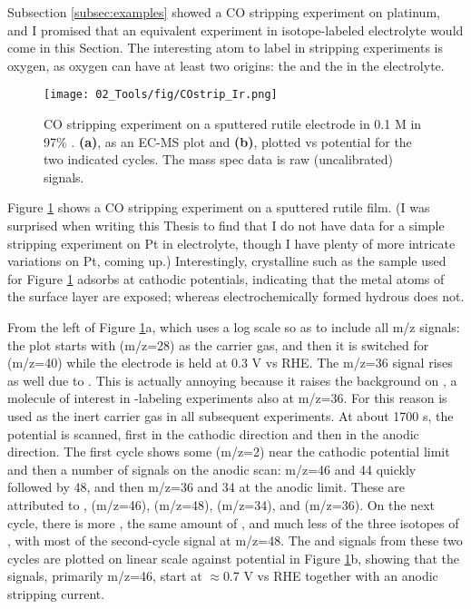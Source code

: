 Subsection \ref{subsec:examples} showed a CO stripping experiment on platinum, and I promised that an equivalent experiment in isotope-labeled electrolyte would come in this Section. The interesting atom to label in  stripping experiments is oxygen, as oxygen can have at least two origins: the  and the  in the electrolyte.

\begin{figure}[h!]
	\centering
	\texttt{[image: 02\_Tools/fig/COstrip\_Ir.png]}
	\caption{CO stripping experiment on a sputtered rutile  electrode in 0.1 M  in 97\% . \textbf{(a)}, as an EC-MS plot and \textbf{(b)}, plotted vs potential for the two indicated cycles. The mass spec data is raw (uncalibrated) signals.}
	\label{fig:IrO2_COstrip}
\end{figure}

Figure \ref{fig:IrO2_COstrip} shows a CO stripping experiment on a sputtered rutile  film. (I was surprised when writing this Thesis to find that I do not have data for a simple  stripping experiment on Pt in  electrolyte, though I have plenty of more intricate variations on Pt, coming up.) Interestingly, crystalline  such as the sample used for Figure \ref{fig:IrO2_COstrip} adsorbs  at cathodic potentials, indicating that the metal atoms of the surface layer are exposed; whereas electrochemically formed hydrous  does not. 

From the left of Figure \ref{fig:IrO2_COstrip}a, which uses a log scale so as to include all m/z signals: the plot starts with  (m/z=28) as the carrier gas, and then it is switched for  (m/z=40) while the electrode is held at 0.3 V vs RHE. The m/z=36 signal rises as well due to . This is actually annoying because it raises the background on , a molecule of interest in -labeling experiments also at m/z=36. For this reason  is used as the inert carrier gas in all subsequent  experiments. At about 1700 s, the potential is scanned, first in the cathodic direction and then in the anodic direction. The first cycle shows some  (m/z=2) near the cathodic potential limit and then a number of signals on the anodic scan: m/z=46 and 44 quickly followed by 48, and then m/z=36 and 34 at the anodic limit. These are attributed to ,  (m/z=46),  (m/z=48),  (m/z=34), and  (m/z=36). On the next cycle, there is more , the same amount of , and much less of the three isotopes of , with most of the second-cycle  signal at m/z=48. The  and  signals from these two cycles are plotted on linear scale against potential in Figure \ref{fig:IrO2_COstrip}b, showing that the  signals, primarily m/z=46, start at $\approx$0.7 V vs RHE together with an anodic stripping current. 
	
